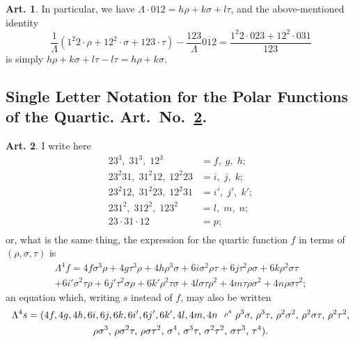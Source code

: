 \documentclass[12pt,a4paper]{article}
\theoremstyle{definition}
\newtheorem{art}{Art.}[section]
\begin{document}
\newpage
\begin{art}\label{art:51}
In particular, we have $\Lambda \cdot 012 = h\rho + k\sigma + l\tau$, and the above-mentioned identity
\[
\frac{1}{\Lambda}(1^2 2 \cdot \rho + 12^2 \cdot \sigma + 123 \cdot \tau) - \frac{123}{\Lambda}\overline{012} = \frac{1^2 2 \cdot 023 + 12^2 \cdot 031}{123}
\]
is simply $h\rho + k\sigma + l\tau - l\tau = h\rho + k\sigma$.
\end{art}

\subsection*{Single Letter Notation for the Polar Functions of the Quartic. Art.~No.~\ref{art:52}.}

\begin{art}\label{art:52}
I write here
\begin{align*}
23^3,\; 31^3,\; 12^3 &= f,\; g,\; h;\\
23^2 31,\; 31^2 12,\; 12^2 23 &= i,\; j,\; k;\\
23^2 12,\; 31^2 23,\; 12^2 31 &= i',\; j',\; k';\\
231^2,\; 312^2,\; 123^2 &= l,\; m,\; n;\\
23 \cdot 31 \cdot 12 &= p;\\
\end{align*}
or, what is the same thing, the expression for the quartic function $f$ in terms of $(\rho, \sigma, \tau)$ is
\begin{multline*}
\Lambda^4 f = 4f\sigma^3\rho + 4g\tau^3\rho + 4h\rho^3\sigma + 6i\sigma^2\rho\tau + 6j\tau^2\rho\sigma + 6k\rho^2\sigma\tau \\
+ 6i'\sigma^2\tau\rho + 6j'\tau^2\sigma\rho + 6k'\rho^2\tau\sigma + 4l\sigma\tau\rho^2 + 4m\tau\rho\sigma^2 + 4n\rho\sigma\tau^2;
\end{multline*}
an equation which, writing $s$ instead of $f$, may also be written
\begin{multline*}
\Lambda^4 s = (4f, 4g, 4h, 6i, 6j, 6k, 6i', 6j', 6k', 4l, 4m, 4n \,\,\,\, \raisebox{0.5ex}{\text{\scriptsize$\rho^4$}}\,\, \rho^3\sigma,\, \rho^3\tau,\, \rho^2\sigma^2,\, \rho^2\sigma\tau,\, \rho^2\tau^2,\\
\rho\sigma^3,\, \rho\sigma^2\tau,\, \rho\sigma\tau^2,\, \sigma^4,\, \sigma^3\tau,\, \sigma^2\tau^2,\, \sigma\tau^3,\, \tau^4).
\end{multline*}
\end{art}
\end{document}
